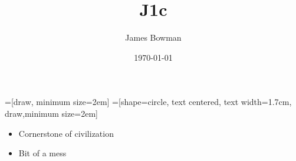 \documentclass[compress,mathserif]{beamer}
\begin{document}
\title{J1c }   
\author{James Bowman} 
\date{\today} 

\frame{\titlepage} 

=[draw, minimum size=2em]
=[shape=circle, text centered, text width=1.7cm, draw,minimum size=2em]
\everymath{\displaystyle}


\begin{frame}
\begin{itemize}
   \item Cornerstone of civilization
   \item Bit of a mess
\end{itemize}
\end{frame}

\emptyslide
\end{document}
